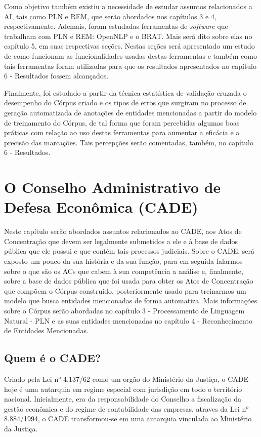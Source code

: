 \documentclass[11pt]{report}
\begin{document}
Como objetivo também existiu a necessidade de estudar assuntos relacionados a AI, tais como PLN e REM, que serão abordados nos capítulos 3 e 4, respectivamente.
Ademais, foram estudadas ferramentas de \textit{software} que trabalham com PLN e REM: OpenNLP e o BRAT. Mais será dito sobre elas no capítulo 5, em suas
respectivas seções. Nestas seções será apresentado um estudo de como funcionam as funcionalidades usadas destas ferramentas e também como tais ferramentas foram
utilizadas para que os resultados apresentados no capítulo 6 - Resultados fossem alcançados.

Finalmente, foi estudado a partir da técnica estatística de validação cruzada o desempenho do Córpus criado e os tipos de erros que surgiram no processo de geração automatizada
de anotações de entidades mencionadas a partir do modelo de treinamento do Córpus, de tal forma que foram percebidas algumas boas práticas com relação ao uso destas ferramentas
para aumentar a eficácia e a precisão das marcações. Tais percepções serão comentadas, também, no capítulo 6 - Resultados.

\pagebreak
\chapter{O Conselho Administrativo de Defesa Econômica (CADE)}

\indent\indent Neste capítulo serão abordados assuntos relacionados ao CADE, aos Atos de Concentração que devem ser legalmente submetidos a ele e à base de dados pública que ele possui e
que contém tais processos judiciais. Sobre o CADE, será exposto um pouco da sua história e da sua função, para em seguida falarmos sobre o que são os ACs que cabem à sua competência
a análise e, finalmente, sobre a base de dados pública que foi usada para obter os Atos de Concentração que compõem o Córpus construído, posteriormente usado para treinarmos um modelo
que busca entidades mencionadas de forma automatiza. Mais informações sobre o Córpus serão abordadas no capítulo 3 - Processamento de Linguagem Natural - PLN e as suas entidades mencionadas no capítulo 4 - Reconhecimento de Entidades Mencionadas.

\section{Quem é o CADE?}

\indent\indent Criado pela Lei n° 4.137/62 como um orgão do Ministério da Justiça, o CADE hoje é uma autarquia em regime especial com jurisdição em todo o território nacional. Inicialmente,
era da responsabilidade do Conselho a fiscalização da gestão econômica e do regime de contabilidade das empresas, atraves da Lei n° 8.884/1994, o CADE transformou-se em uma
autarquia vinculada ao Ministério da Justiça.
\end{document}
